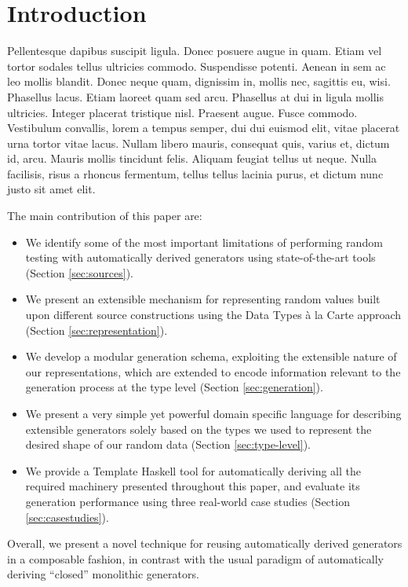 \section{Introduction}
\label{sec:intro}

Pellentesque dapibus suscipit ligula. Donec posuere augue in quam. Etiam vel
tortor sodales tellus ultricies commodo. Suspendisse potenti. Aenean in sem ac
leo mollis blandit. Donec neque quam, dignissim in, mollis nec, sagittis eu,
wisi. Phasellus lacus. Etiam laoreet quam sed arcu. Phasellus at dui in ligula
mollis ultricies. Integer placerat tristique nisl. Praesent augue. Fusce
commodo. Vestibulum convallis, lorem a tempus semper, dui dui euismod elit,
vitae placerat urna tortor vitae lacus. Nullam libero mauris, consequat quis,
varius et, dictum id, arcu. Mauris mollis tincidunt felis. Aliquam feugiat
tellus ut neque. Nulla facilisis, risus a rhoncus fermentum, tellus tellus
lacinia purus, et dictum nunc justo sit amet elit.




The main contribution of this paper are:
%
\begin{itemize}
\item We identify some of the most important limitations of performing random
  testing with automatically derived generators using state-of-the-art tools
  (Section \ref{sec:sources}).
\item We present an extensible mechanism for representing random values built
  upon different source constructions using the Data Types \`a la Carte approach
  (Section \ref{sec:representation}).
\item We develop a modular generation schema, exploiting the extensible nature
  of our representations, which are extended to encode information relevant to
  the generation process at the type level (Section \ref{sec:generation}).
\item We present a very simple yet powerful domain specific language for
  describing extensible generators solely based on the types we used to
  represent the desired shape of our random data (Section \ref{sec:type-level}).
\item We provide a Template Haskell tool for automatically deriving all the
  required machinery presented throughout this paper, and evaluate its
  generation performance using three real-world case studies (Section
  \ref{sec:casestudies}).
\end{itemize}

Overall, we present a novel technique for reusing automatically derived
generators in a composable fashion, in contrast with the usual paradigm of
automatically deriving ``closed'' monolithic generators.